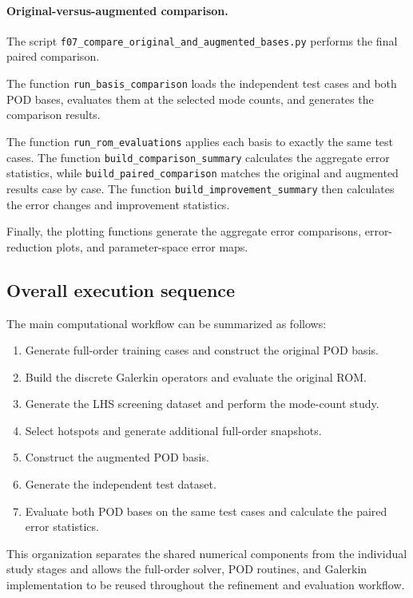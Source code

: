 \paragraph{Original-versus-augmented comparison.}

The script
\texttt{f07\_compare\_original\_and\_augmented\_bases.py}
performs the final paired comparison.

The function \texttt{run\_basis\_comparison}
loads the independent test cases and both POD
bases, evaluates them at the selected mode
counts, and generates the comparison results.

The function \texttt{run\_rom\_evaluations}
applies each basis to exactly the same test
cases. The function \texttt{build\_comparison\_summary}
calculates the aggregate error statistics,
while \texttt{build\_paired\_comparison}
matches the original and augmented results
case by case. The function
\texttt{build\_improvement\_summary}
then calculates the error changes and
improvement statistics.

Finally, the plotting functions generate the
aggregate error comparisons, error-reduction
plots, and parameter-space error maps.

\subsection{Overall execution sequence}

The main computational workflow can be summarized
as follows:
\begin{enumerate}
    \item Generate full-order training cases and
    construct the original POD basis.
    \item Build the discrete Galerkin operators
    and evaluate the original ROM.
    \item Generate the LHS screening dataset and
    perform the mode-count study.
    \item Select hotspots and generate additional
    full-order snapshots.
    \item Construct the augmented POD basis.
    \item Generate the independent test dataset.
    \item Evaluate both POD bases on the same test
    cases and calculate the paired error statistics.
\end{enumerate}

This organization separates the shared numerical
components from the individual study stages and
allows the full-order solver, POD routines, and
Galerkin implementation to be reused throughout
the refinement and evaluation workflow.
